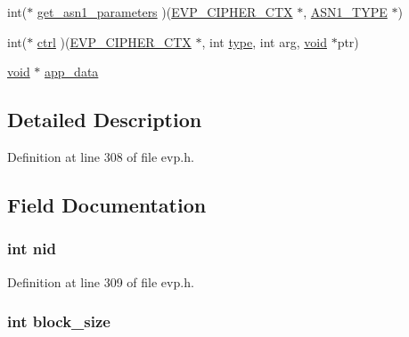 \begin{DoxyCompactItemize}
\item 
int($\ast$ \hyperlink{structevp__cipher__st_a7bad788d28a1739af860d7877847f835}{get\+\_\+asn1\+\_\+parameters} )(\hyperlink{crypto_2ossl__typ_8h_aab2bd6a044e1d31ebc2fe82b3b0b3d9a}{E\+V\+P\+\_\+\+C\+I\+P\+H\+E\+R\+\_\+\+C\+TX} $\ast$, \hyperlink{crypto_2asn1_2asn1_8h_a7895e03d9fee2bc4963faf2a31a9439e}{A\+S\+N1\+\_\+\+T\+Y\+PE} $\ast$)
\item 
int($\ast$ \hyperlink{structevp__cipher__st_ab3ec1f933922b2d87b5474190f8e899d}{ctrl} )(\hyperlink{crypto_2ossl__typ_8h_aab2bd6a044e1d31ebc2fe82b3b0b3d9a}{E\+V\+P\+\_\+\+C\+I\+P\+H\+E\+R\+\_\+\+C\+TX} $\ast$, int \hyperlink{include_2openssl_2x509_8h_ab512b8f495325c7ea0f5a5a5d3f938eb}{type}, int arg, \hyperlink{hw__4758__cca_8h_afad4d591c7931ff6dc5bf69c76c96aa0}{void} $\ast$ptr)
\item 
\hyperlink{hw__4758__cca_8h_afad4d591c7931ff6dc5bf69c76c96aa0}{void} $\ast$ \hyperlink{structevp__cipher__st_a2d755a5df39e3da5ae2a0630fbe24c41}{app\+\_\+data}
\end{DoxyCompactItemize}


\subsection{Detailed Description}


Definition at line 308 of file evp.\+h.



\subsection{Field Documentation}
\subsubsection[{\texorpdfstring{nid}{nid}}]{\setlength{\rightskip}{0pt plus 5cm}int nid}\hypertarget{structevp__cipher__st_a7235ef62e89328f5155846dc59c6fc37}{}\label{structevp__cipher__st_a7235ef62e89328f5155846dc59c6fc37}


Definition at line 309 of file evp.\+h.

\subsubsection[{\texorpdfstring{block\+\_\+size}{block_size}}]{\setlength{\rightskip}{0pt plus 5cm}int block\+\_\+size}\hypertarget{structevp__cipher__st_a70b27761c7d0bd5cd90f4fe47e569b94}{}\label{structevp__cipher__st_a70b27761c7d0bd5cd90f4fe47e569b94}


